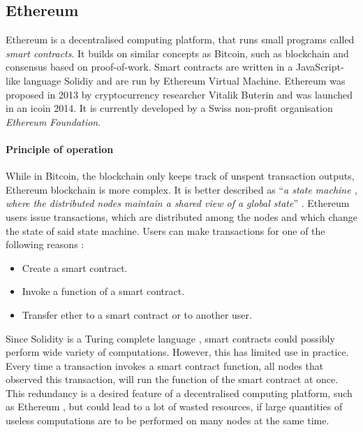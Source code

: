 \subsection{Ethereum}

Ethereum is a decentralised computing platform, that runs small programs called \textit{smart contracts}. It builds on similar concepts as Bitcoin, such as blockchain and consensus based on proof-of-work. Smart contracts are written in a JavaScript-like language Solidiy and are run by Ethereum Virtual Machine. Ethereum was proposed in 2013 by cryptocurrency researcher Vitalik Buterin and was launched in an \acrlong{ico}\footnotemark  in 2014. 
% 
% 
It is currently developed by a Swiss non-profit organisation \textit{Ethereum Foundation}.\footnotemark
% 

\paragraph{Principle of operation}
While in Bitcoin, the blockchain only keeps track of unspent transaction outputs, Ethereum blockchain is more complex. It is better described as ``\textit{a state machine , where the distributed nodes maintain a shared view of a global state}'' \cite{Tikhomirov2018Ethereum:Perspectives}. Ethereum users issue transactions, which are distributed among the nodes and which change the state of said state machine. Users can make transactions for one of the following reasons \cite{Atzei2017ASoK}:
\begin{itemize}[noitemsep]
    \item Create a smart contract.
    \item Invoke a function of a smart contract.
    \item Transfer ether to a smart contract or to another user.
\end{itemize}

Since Solidity is a Turing complete language \cite{Tikhomirov2018Ethereum:Perspectives, Atzei2017ASoK, Dannen2017IntroducingSolidity}, smart contracts could possibly perform wide variety of computations. However, this has limited use in practice. Every time a transaction invokes a smart contract function, all nodes that observed this transaction, will run the function of the smart contract at once. This redundancy is a desired feature of a decentralised computing platform, such as Ethereum \cite{EthereumCommunityEthereumDocumentation}, but could lead to a lot of wasted resources, if large quantities of useless computations are to be performed on many nodes at the same time.


